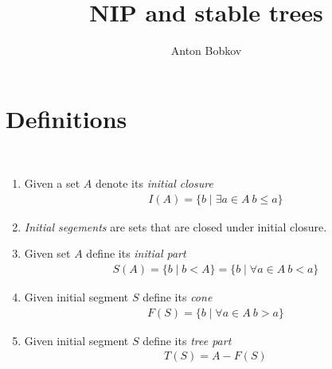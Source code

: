 \documentclass{amsart}
\begin{document}
\title{NIP and stable trees}
\author{Anton Bobkov}

\maketitle

\section{Definitions}

\begin{Definition}\ 
	\begin{enumerate}
		\item Given a set $A$ denote its \emph{initial closure} 
		\begin{align*}
			I(A) = \{b \mid \exists a \in A \ b \leq a\}
		\end{align*}
		\item \emph{Initial segements} are sets that are closed under initial closure.
		\item Given set $A$ define its \emph{initial part}
		\begin{align*}
			S(A) = \{b \mid b < A\} = \{b \mid \forall a \in A \ b < a\}
		\end{align*}
		\item Given initial segment $S$ define its \emph{cone}
		\begin{align*}
			F(S) = \{b \mid \forall a \in A \ b > a\}
		\end{align*}
		\item Given initial segment $S$ define its \emph{tree part}
		\begin{align*}
			T(S) = A - F(S)
		\end{align*}
	\end{enumerate}
\end{Definition}
\end{document}
